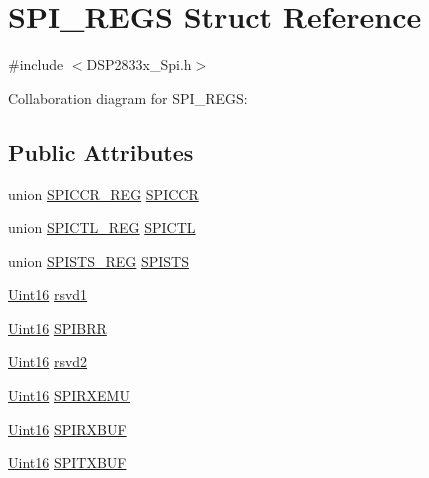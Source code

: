 \hypertarget{struct_s_p_i___r_e_g_s}{}\section{S\+P\+I\+\_\+\+R\+E\+G\+S Struct Reference}
\label{struct_s_p_i___r_e_g_s}


{\ttfamily \#include $<$D\+S\+P2833x\+\_\+\+Spi.\+h$>$}



Collaboration diagram for S\+P\+I\+\_\+\+R\+E\+G\+S\+:
\subsection*{Public Attributes}
\begin{DoxyCompactItemize}
\item 
union \hyperlink{union_s_p_i_c_c_r___r_e_g}{S\+P\+I\+C\+C\+R\+\_\+\+R\+E\+G} \hyperlink{struct_s_p_i___r_e_g_s_a6d1a5b03b5d864f061b4a99a6b1d4c79}{S\+P\+I\+C\+C\+R}
\item 
union \hyperlink{union_s_p_i_c_t_l___r_e_g}{S\+P\+I\+C\+T\+L\+\_\+\+R\+E\+G} \hyperlink{struct_s_p_i___r_e_g_s_a1838ca1e476cbd32089e35d93ed2a919}{S\+P\+I\+C\+T\+L}
\item 
union \hyperlink{union_s_p_i_s_t_s___r_e_g}{S\+P\+I\+S\+T\+S\+\_\+\+R\+E\+G} \hyperlink{struct_s_p_i___r_e_g_s_a84471d291e5106600bd4d397af42fe98}{S\+P\+I\+S\+T\+S}
\item 
\hyperlink{_d_s_p2833x___device_8h_a59a9f6be4562c327cbfb4f7e8e18f08b}{Uint16} \hyperlink{struct_s_p_i___r_e_g_s_a0cf11dc145a9cf8ba08002beaca0f59a}{rsvd1}
\item 
\hyperlink{_d_s_p2833x___device_8h_a59a9f6be4562c327cbfb4f7e8e18f08b}{Uint16} \hyperlink{struct_s_p_i___r_e_g_s_acce7cd9580d158a8359b49ba4c1459e7}{S\+P\+I\+B\+R\+R}
\item 
\hyperlink{_d_s_p2833x___device_8h_a59a9f6be4562c327cbfb4f7e8e18f08b}{Uint16} \hyperlink{struct_s_p_i___r_e_g_s_a21b7d89fa6a29f296be31fc876c16b80}{rsvd2}
\item 
\hyperlink{_d_s_p2833x___device_8h_a59a9f6be4562c327cbfb4f7e8e18f08b}{Uint16} \hyperlink{struct_s_p_i___r_e_g_s_a2ea20c8abc17c63ec2dc52fe60c547db}{S\+P\+I\+R\+X\+E\+M\+U}
\item 
\hyperlink{_d_s_p2833x___device_8h_a59a9f6be4562c327cbfb4f7e8e18f08b}{Uint16} \hyperlink{struct_s_p_i___r_e_g_s_a6e3c4fed627563bea02693fa31083f1e}{S\+P\+I\+R\+X\+B\+U\+F}
\item 
\hyperlink{_d_s_p2833x___device_8h_a59a9f6be4562c327cbfb4f7e8e18f08b}{Uint16} \hyperlink{struct_s_p_i___r_e_g_s_a98ae19da5d7e129158cce4d40783a20a}{S\+P\+I\+T\+X\+B\+U\+F}

\end{DoxyCompactItemize}
